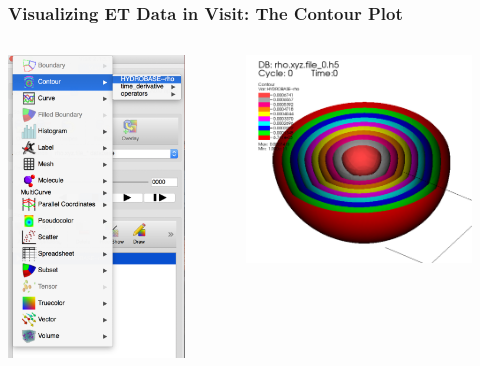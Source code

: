 \documentclass[]{beamer}
\begin{document}
\begin{frame}
  \frametitle{Visualizing ET Data in Visit: The Contour Plot}
  \begin{columns}
    \begin{column}{6cm}
      \begin{center}
        \includegraphics[height=8cm]{figures/visit/visit-contour-start}
      \end{center}
    \end{column}
    \begin{column}{6cm}
      \begin{center}
        \includegraphics[width=6cm]{figures/visit/contour-1-star-no-symmetry}
      \end{center}
    \end{column}
  \end{columns}
\end{frame}
\end{document}
